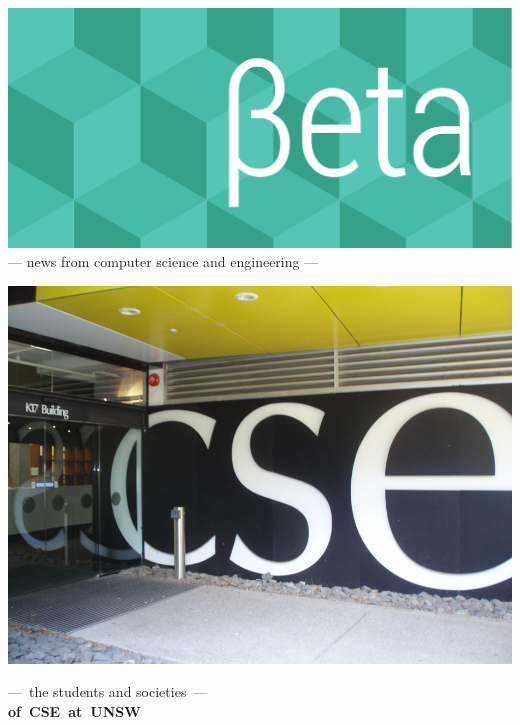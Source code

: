 \documentclass[twoside]{article}
\date{2 September 2015}
\begin{document}
\thispagestyle{empty}
\begingroup%
\vspace*{-3.5cm}\centering\hspace*{-2.8cm}%
\includegraphics[trim=0mm 20mm 0mm 0mm, clip, width=22cm]{../../style/beta-logo.pdf}%
\vspace{1em}
{\sffamily\fontsize{32pt}{32pt}\selectfont --- news from computer science and engineering ---}
\endgroup\vspace*{3ex}

\center\vfill

\includegraphics[trim=0mm 30mm 0mm 45mm, clip, width=1\linewidth]{images/beta101-cse.png}

{\fontsize{48pt}{48pt}\selectfont\sffamily ---~the students and societies~---\\
 \bfseries of~CSE~at~UNSW}

\vfill\endcenter
\end{document}
